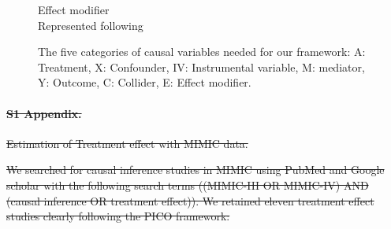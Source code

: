 \documentclass[10pt,letterpaper]{article}
\providecommand{\DIFdeltex}[1]{{\protect\color{red}\sout{#1}}}                      %
\providecommand{\DIFdelbegin}{} %
\providecommand{\DIFdelend}{} %
\providecommand{\DIFdel}[1]{\texorpdfstring{\DIFdeltex{#1}}{}} %
\newcommand{\DIFscaledelfig}{0.5}
\newlength{\DIFdelgraphicswidth} %
\newlength{\DIFdelgraphicsheight} %
\newcommand{\DIFdelincludegraphics}[2][]{%
\sbox{\DIFdelgraphicsbox}{\DIFOincludegraphics[#1]{#2}}%
\settoboxwidth{\DIFdelgraphicswidth}{\DIFdelgraphicsbox} %
\settoboxtotalheight{\DIFdelgraphicsheight}{\DIFdelgraphicsbox} %
\scalebox{\DIFscaledelfig}{%
\parbox[b]{\DIFdelgraphicswidth}{\usebox{\DIFdelgraphicsbox}\\[-\baselineskip] \rule{\DIFdelgraphicswidth}{0em}}\llap{\resizebox{\DIFdelgraphicswidth}{\DIFdelgraphicsheight}{%
\setlength{\unitlength}{\DIFdelgraphicswidth}%
\begin{picture}(1,1)%
\thicklines\linethickness{2pt} %
{\color[rgb]{1,0,0}\put(0,0){\framebox(1,1){}}}%
{\color[rgb]{1,0,0}\put(0,0){\line( 1,1){1}}}%
{\color[rgb]{1,0,0}\put(0,1){\line(1,-1){1}}}%
\end{picture}%
}\hspace*{3pt}}} %
} %
\DeclareRobustCommand{\DIFdelbegin}{\DIFOdelbegin \let\includegraphics\DIFdelincludegraphics} %
\DeclareRobustCommand{\DIFdelend}{\DIFOaddend \let\includegraphics\DIFOincludegraphics} %
\begin{document}
\begin{figure}[h!]
\begin{minipage}[t]{0.4\linewidth}
    \small\sffamily Effect modifier \scriptsize\\Represented
    following \cite{attia2022proposal}
  \end{minipage}
  \caption{The five categories of causal variables needed for our framework: A:
    Treatment, X: Confounder, IV: Instrumental variable, M: mediator, Y:
    Outcome, C: Collider, E: Effect modifier.}\label{fig:causal_variables}
\end{figure}
\clearpage



\DIFdelbegin \paragraph*{\DIFdel{S1 Appendix.}}
\DIFdel{Estimation of Treatment effect with MIMIC data.}%
\DIFdelend %

\DIFdelbegin \DIFdel{We searched for causal inference studies in MIMIC using PubMed and Google
scholar with the following search terms ((MIMIC-III OR MIMIC-IV) AND (causal
inference OR treatment effect)). We retained eleven treatment effect studies
clearly following the PICO framework:
}\DIFdelend %
\end{document}
